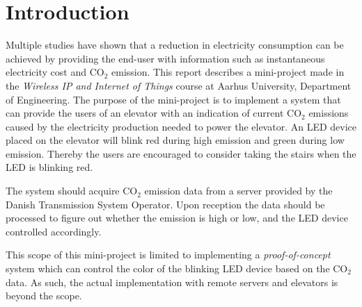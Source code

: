 \documentclass[Main]{subfiles}
\begin{document}
\section*{Introduction} %
\label{sec:introduction}
	Multiple studies have shown that a reduction in electricity consumption can be achieved by providing the end-user with information such as instantaneous electricity cost and CO$_2$ emission\cite{Tricascade:2009:Online}. 
	This report describes a mini-project made in the \emph{Wireless IP and Internet of Things} course at Aarhus University, Department of Engineering. 
	The purpose of the mini-project is to implement a system that can provide the users of an elevator with an indication of current CO$_2$ emissions caused by the electricity production needed to power the elevator. 
	An LED device placed on the elevator will blink red during high emission and green during low emission. 
	Thereby the users are encouraged to consider taking the stairs when the LED is blinking red. 

	The system should acquire CO$_2$ emission data from a server provided by the Danish Transmission System Operator. 
	Upon reception the data should be processed to figure out whether the emission is high or low, and the LED device controlled accordingly.

	This scope of this mini-project is limited to implementing a \emph{proof-of-concept} system which can control the color of the blinking LED device based on the CO$_2$ data.
	As such, the actual implementation with remote servers and elevators is beyond the scope.



\end{document}

